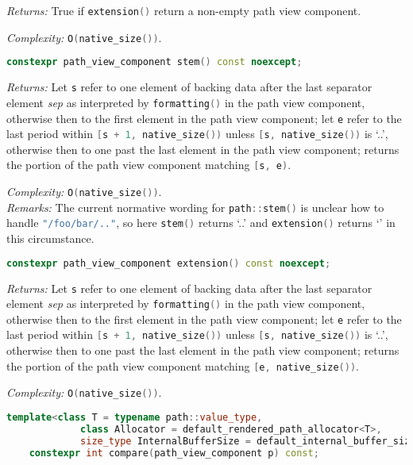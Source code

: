 \documentclass[11pt]{article}
\newcommand{\code}[2][cpp]{\lstinline[language=#1,basicstyle=\small\ttfamily]{#2}}
\newcommand{\desc}[1]{\textit{#1}}
\newcommand{\returns}{\desc{Returns: }}
\newcommand{\remarks}{\desc{Remarks: }}
\newcommand{\complexity}{\desc{Complexity: }}
\begin{document}
\returns True if \code{extension()} return a non-empty path view component.

\complexity \code{O(native_size())}.\\

\begin{lstlisting}[language=cpp]
    constexpr path_view_component stem() const noexcept;
\end{lstlisting}

\returns Let \code{s} refer to one element of backing data after the last separator element \emph{sep} as interpreted by \code{formatting()} in the path view component, otherwise then to the first element in the path view component; let \code{e} refer to the last period within \code{[s + 1, native_size())} unless \code{[s, native_size())} is `..', otherwise then to one past the last element in the path view component; returns the portion of the path view component matching \code{[s, e)}.

\complexity \code{O(native_size())}.\\

\remarks{The current normative wording for \code{path::stem()} is unclear how to handle \code{"/foo/bar/.."}, so here \code{stem()} returns `..' and \code{extension()} returns `' in this circumstance.}

\begin{lstlisting}[language=cpp]
    constexpr path_view_component extension() const noexcept;
\end{lstlisting}

\returns Let \code{s} refer to one element of backing data after the last separator element \emph{sep} as interpreted by \code{formatting()} in the path view component, otherwise then to the first element in the path view component; let \code{e} refer to the last period within \code{[s + 1, native_size())} unless \code{[s, native_size())} is `..', otherwise then to one past the last element in the path view component; returns the portion of the path view component matching \code{[e, native_size())}.

\complexity \code{O(native_size())}.\\

\begin{lstlisting}[language=cpp]
    template<class T = typename path::value_type,
             class Allocator = default_rendered_path_allocator<T>,
             size_type InternalBufferSize = default_internal_buffer_size>
    constexpr int compare(path_view_component p) const;
\end{lstlisting}
\end{document}
